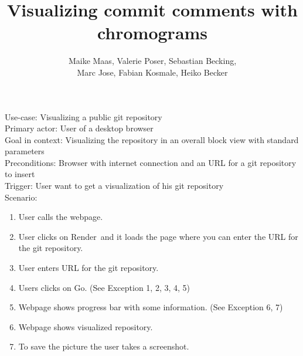 \documentclass[11pt]{scrartcl}
\author{Maike Maas, Valerie Poser, Sebastian Becking,\\
Marc Jose, Fabian Kosmale, Heiko Becker}
\title{Visualizing commit comments with chromograms}
\begin{document}
\maketitle


Use-case: Visualizing a public git repository \\
Primary actor: User of a desktop browser \\
Goal in context: Visualizing the repository in an overall block view with standard parameters \\
Preconditions: Browser with internet connection and an URL for a git repository to insert \\
Trigger: User want to get a visualization of his git repository \\

Scenario:
\begin{enumerate}
\item User calls the webpage.
\item User clicks on \grqq Render\grqq ~and it loads the page where you can enter the URL for the git repository. 
\item User enters URL for the git repository. 
\item Users clicks on \grqq Go\grqq. (See Exception 1, 2, 3, 4, 5)
\item Webpage shows progress bar with some information. (See Exception 6, 7)
\item Webpage shows visualized repository.
\item To save the picture the user takes a screenshot.
\end{enumerate}
\end{document}
